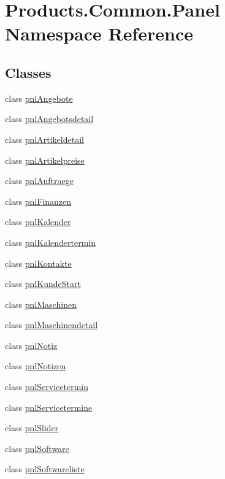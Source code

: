\hypertarget{namespace_products_1_1_common_1_1_panel}{}\section{Products.\+Common.\+Panel Namespace Reference}
\label{namespace_products_1_1_common_1_1_panel}
\subsection*{Classes}
\begin{DoxyCompactItemize}
\item 
class \hyperlink{class_products_1_1_common_1_1_panel_1_1pnl_angebote}{pnl\+Angebote}
\item 
class \hyperlink{class_products_1_1_common_1_1_panel_1_1pnl_angebotsdetail}{pnl\+Angebotsdetail}
\item 
class \hyperlink{class_products_1_1_common_1_1_panel_1_1pnl_artikeldetail}{pnl\+Artikeldetail}
\item 
class \hyperlink{class_products_1_1_common_1_1_panel_1_1pnl_artikelpreise}{pnl\+Artikelpreise}
\item 
class \hyperlink{class_products_1_1_common_1_1_panel_1_1pnl_auftraege}{pnl\+Auftraege}
\item 
class \hyperlink{class_products_1_1_common_1_1_panel_1_1pnl_finanzen}{pnl\+Finanzen}
\item 
class \hyperlink{class_products_1_1_common_1_1_panel_1_1pnl_kalender}{pnl\+Kalender}
\item 
class \hyperlink{class_products_1_1_common_1_1_panel_1_1pnl_kalendertermin}{pnl\+Kalendertermin}
\item 
class \hyperlink{class_products_1_1_common_1_1_panel_1_1pnl_kontakte}{pnl\+Kontakte}
\item 
class \hyperlink{class_products_1_1_common_1_1_panel_1_1pnl_kunde_start}{pnl\+Kunde\+Start}
\item 
class \hyperlink{class_products_1_1_common_1_1_panel_1_1pnl_maschinen}{pnl\+Maschinen}
\item 
class \hyperlink{class_products_1_1_common_1_1_panel_1_1pnl_maschinendetail}{pnl\+Maschinendetail}
\item 
class \hyperlink{class_products_1_1_common_1_1_panel_1_1pnl_notiz}{pnl\+Notiz}
\item 
class \hyperlink{class_products_1_1_common_1_1_panel_1_1pnl_notizen}{pnl\+Notizen}
\item 
class \hyperlink{class_products_1_1_common_1_1_panel_1_1pnl_servicetermin}{pnl\+Servicetermin}
\item 
class \hyperlink{class_products_1_1_common_1_1_panel_1_1pnl_servicetermine}{pnl\+Servicetermine}
\item 
class \hyperlink{class_products_1_1_common_1_1_panel_1_1pnl_slider}{pnl\+Slider}
\item 
class \hyperlink{class_products_1_1_common_1_1_panel_1_1pnl_software}{pnl\+Software}
\item 
class \hyperlink{class_products_1_1_common_1_1_panel_1_1pnl_softwareliste}{pnl\+Softwareliste}
\end{DoxyCompactItemize}
